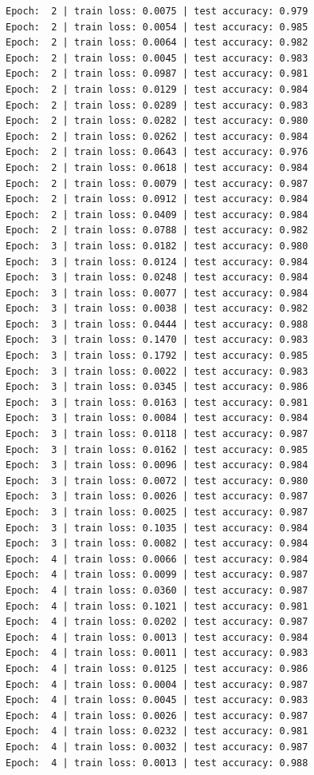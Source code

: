 \documentclass[11pt,UTF8]{ctexart}
\begin{document}
\begin{verbatim}
Epoch:  2 | train loss: 0.0075 | test accuracy: 0.979
Epoch:  2 | train loss: 0.0054 | test accuracy: 0.985
Epoch:  2 | train loss: 0.0064 | test accuracy: 0.982
Epoch:  2 | train loss: 0.0045 | test accuracy: 0.983
Epoch:  2 | train loss: 0.0987 | test accuracy: 0.981
Epoch:  2 | train loss: 0.0129 | test accuracy: 0.984
Epoch:  2 | train loss: 0.0289 | test accuracy: 0.983
Epoch:  2 | train loss: 0.0282 | test accuracy: 0.980
Epoch:  2 | train loss: 0.0262 | test accuracy: 0.984
Epoch:  2 | train loss: 0.0643 | test accuracy: 0.976
Epoch:  2 | train loss: 0.0618 | test accuracy: 0.984
Epoch:  2 | train loss: 0.0079 | test accuracy: 0.987
Epoch:  2 | train loss: 0.0912 | test accuracy: 0.984
Epoch:  2 | train loss: 0.0409 | test accuracy: 0.984
Epoch:  2 | train loss: 0.0788 | test accuracy: 0.982
Epoch:  3 | train loss: 0.0182 | test accuracy: 0.980
Epoch:  3 | train loss: 0.0124 | test accuracy: 0.984
Epoch:  3 | train loss: 0.0248 | test accuracy: 0.984
Epoch:  3 | train loss: 0.0077 | test accuracy: 0.984
Epoch:  3 | train loss: 0.0038 | test accuracy: 0.982
Epoch:  3 | train loss: 0.0444 | test accuracy: 0.988
Epoch:  3 | train loss: 0.1470 | test accuracy: 0.983
Epoch:  3 | train loss: 0.1792 | test accuracy: 0.985
Epoch:  3 | train loss: 0.0022 | test accuracy: 0.983
Epoch:  3 | train loss: 0.0345 | test accuracy: 0.986
Epoch:  3 | train loss: 0.0163 | test accuracy: 0.981
Epoch:  3 | train loss: 0.0084 | test accuracy: 0.984
Epoch:  3 | train loss: 0.0118 | test accuracy: 0.987
Epoch:  3 | train loss: 0.0162 | test accuracy: 0.985
Epoch:  3 | train loss: 0.0096 | test accuracy: 0.984
Epoch:  3 | train loss: 0.0072 | test accuracy: 0.980
Epoch:  3 | train loss: 0.0026 | test accuracy: 0.987
Epoch:  3 | train loss: 0.0025 | test accuracy: 0.987
Epoch:  3 | train loss: 0.1035 | test accuracy: 0.984
Epoch:  3 | train loss: 0.0082 | test accuracy: 0.984
Epoch:  4 | train loss: 0.0066 | test accuracy: 0.984
Epoch:  4 | train loss: 0.0099 | test accuracy: 0.987
Epoch:  4 | train loss: 0.0360 | test accuracy: 0.987
Epoch:  4 | train loss: 0.1021 | test accuracy: 0.981
Epoch:  4 | train loss: 0.0202 | test accuracy: 0.987
Epoch:  4 | train loss: 0.0013 | test accuracy: 0.984
Epoch:  4 | train loss: 0.0011 | test accuracy: 0.983
Epoch:  4 | train loss: 0.0125 | test accuracy: 0.986
Epoch:  4 | train loss: 0.0004 | test accuracy: 0.987
Epoch:  4 | train loss: 0.0045 | test accuracy: 0.983
Epoch:  4 | train loss: 0.0026 | test accuracy: 0.987
Epoch:  4 | train loss: 0.0232 | test accuracy: 0.981
Epoch:  4 | train loss: 0.0032 | test accuracy: 0.987
Epoch:  4 | train loss: 0.0013 | test accuracy: 0.988

\end{verbatim}
\end{document}
